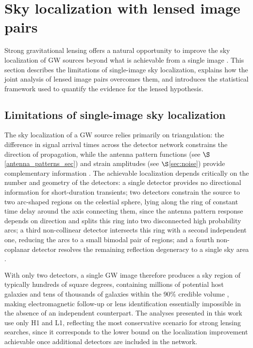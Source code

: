 \section{Sky localization with lensed image pairs}
\label{sec:sky_localization_lensing}

Strong gravitational lensing offers a natural opportunity 
to improve the sky localization of GW sources beyond what 
is achievable from a single image \cite{Hannuksela_skyloc}. This section describes the limitations of single-image sky localization, explains how the joint analysis of lensed image pairs overcomes them, and introduces the statistical framework used to quantify the evidence for the lensed hypothesis.

\subsection{Limitations of single-image sky localization}
\label{sec:single_image_skyloc}

The sky localization of a GW source relies primarily on 
triangulation: the difference in signal arrival times 
across the detector network constrains the direction of 
propagation, while the antenna pattern functions (see $\S$\ref{antenna_patterns_sec}) and strain amplitudes (see $\S$\ref{sec:noise}) provide complementary information 
\cite{lensing_regimes}. The achievable localization 
depends critically on the number and geometry of the 
detectors: a single detector provides no directional 
information for short-duration transients; two detectors 
constrain the source to two arc-shaped regions on the 
celestial sphere, lying along the ring of constant time 
delay around the axis connecting them, since the antenna 
pattern response depends on direction and splits this 
ring into two disconnected high probability arcs; a third non-collinear detector intersects this ring with a second independent one, reducing the arcs to a small bimodal pair of regions; and a fourth non-coplanar detector resolves the remaining reflection degeneracy to a single sky area \cite{triangulation_GW}.


With only two detectors, a single GW image therefore 
produces a sky region of typically hundreds of 
square degrees, containing millions of potential host 
galaxies and tens of thousands of galaxies within the 
90\% credible volume \cite{hubble_constant_lensing}, 
making electromagnetic follow-up or lens identification 
essentially impossible in the absence of an independent 
counterpart. The analyses presented in this work use 
only H1 and L1, reflecting the most conservative scenario 
for strong lensing searches, since it corresponds to the 
lower bound on the localization improvement achievable 
once additional detectors are included in the network.

